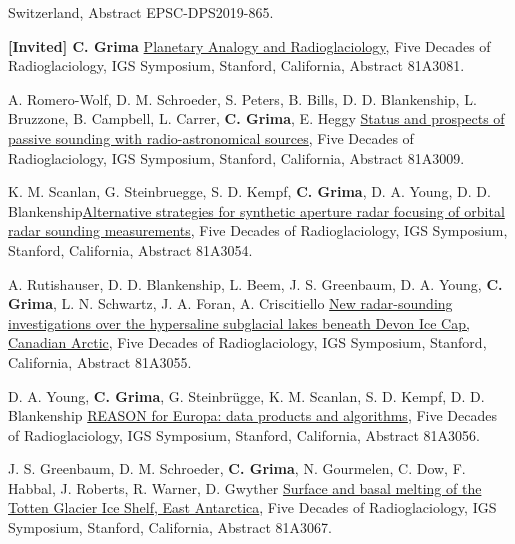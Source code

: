 \begin{etaremune}
  Switzerland, Abstract EPSC-DPS2019-865.
\item
  \textbf{{[}Invited{]} C. Grima}
  \href{https://www.igsoc.org/symposia/2019/stanford/proceedings/procsfiles/procabstracts_75.html\#A3081}{Planetary
  Analogy and Radioglaciology}, Five Decades of Radioglaciology, IGS
  Symposium, Stanford, California, Abstract 81A3081.
\item
  A. Romero-Wolf, D. M. Schroeder, S. Peters, B. Bills, D. D.
  Blankenship, L. Bruzzone, B. Campbell, L. Carrer, \textbf{C. Grima},
  E. Heggy
  \href{https://www.igsoc.org/symposia/2019/stanford/proceedings/procsfiles/procabstracts_75.html\#A3009}{Status
  and prospects of passive sounding with radio-astronomical sources},
  Five Decades of Radioglaciology, IGS Symposium, Stanford, California,
  Abstract 81A3009.
\item
  K. M. Scanlan, G. Steinbruegge, S. D. Kempf, \textbf{C. Grima}, D. A.
  Young, D. D.
  Blankenship\href{https://www.igsoc.org/symposia/2019/stanford/proceedings/procsfiles/procabstracts_75.html\#A3054}{Alternative
  strategies for synthetic aperture radar focusing of orbital radar
  sounding measurements}, Five Decades of Radioglaciology, IGS
  Symposium, Stanford, California, Abstract 81A3054.
\item
  A. Rutishauser, D. D. Blankenship, L. Beem, J. S. Greenbaum, D. A.
  Young, \textbf{C. Grima}, L. N. Schwartz, J. A. Foran, A. Criscitiello
  \href{https://www.igsoc.org/symposia/2019/stanford/proceedings/programmepure.html\#Prog3055}{New
  radar-sounding investigations over the hypersaline subglacial lakes
  beneath Devon Ice Cap, Canadian Arctic}, Five Decades of
  Radioglaciology, IGS Symposium, Stanford, California, Abstract
  81A3055.
\item
  D. A. Young, \textbf{C. Grima}, G. Steinbrügge, K. M. Scanlan, S. D.
  Kempf, D. D. Blankenship
  \href{https://www.igsoc.org/symposia/2019/stanford/proceedings/programmepure.html\#Prog3056}{REASON
  for Europa: data products and algorithms}, Five Decades of
  Radioglaciology, IGS Symposium, Stanford, California, Abstract
  81A3056.
\item
  J. S. Greenbaum, D. M. Schroeder, \textbf{C. Grima}, N. Gourmelen, C.
  Dow, F. Habbal, J. Roberts, R. Warner, D. Gwyther
  \href{https://www.igsoc.org/symposia/2019/stanford/proceedings/programmepure.html\#Prog3067}{Surface
  and basal melting of the Totten Glacier Ice Shelf, East Antarctica},
  Five Decades of Radioglaciology, IGS Symposium, Stanford, California,
  Abstract 81A3067.
\item

\end{etaremune}
